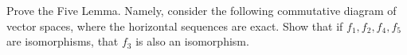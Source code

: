 \documentclass[10pt]{mypackage}
\begin{document}
\begin{problem}[Problem 4]
  Prove the Five Lemma. Namely, consider the following commutative diagram of vector spaces, where the horizontal sequences are exact. Show that if $f_1,f_2,f_4,f_5$ are isomorphisms, that $f_3$ is also an isomorphism.
  \begin{center}
  \end{center}
\end{problem}
\end{document}
